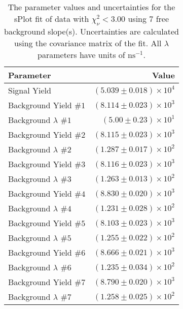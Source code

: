 
\begin{table}
    \begin{center}
        \begin{tabular}{lr}\toprule
            Parameter & Value \\\midrule
            Signal Yield & $(5.039 \pm 0.018) \times 10^{4}$ \\
            Background Yield $\#1$ & $(8.114 \pm 0.023) \times 10^{3}$ \\
            Background $\lambda$ $\#1$ & $(5.00 \pm 0.23) \times 10^{1}$ \\
            Background Yield $\#2$ & $(8.115 \pm 0.023) \times 10^{3}$ \\
            Background $\lambda$ $\#2$ & $(1.287 \pm 0.017) \times 10^{2}$ \\
            Background Yield $\#3$ & $(8.116 \pm 0.023) \times 10^{3}$ \\
            Background $\lambda$ $\#3$ & $(1.263 \pm 0.013) \times 10^{2}$ \\
            Background Yield $\#4$ & $(8.830 \pm 0.020) \times 10^{3}$ \\
            Background $\lambda$ $\#4$ & $(1.231 \pm 0.028) \times 10^{2}$ \\
            Background Yield $\#5$ & $(8.103 \pm 0.023) \times 10^{3}$ \\
            Background $\lambda$ $\#5$ & $(1.255 \pm 0.022) \times 10^{2}$ \\
            Background Yield $\#6$ & $(8.666 \pm 0.021) \times 10^{3}$ \\
            Background $\lambda$ $\#6$ & $(1.235 \pm 0.034) \times 10^{2}$ \\
            Background Yield $\#7$ & $(8.790 \pm 0.020) \times 10^{3}$ \\
            Background $\lambda$ $\#7$ & $(1.258 \pm 0.025) \times 10^{2}$ \\\bottomrule
        \end{tabular}
        \caption{The parameter values and uncertainties for the sPlot fit of data with $\chi^2_\nu < 3.00$ using 7 free background slope(s). Uncertainties are calculated using the covariance matrix of the fit. All $\lambda$ parameters have units of $\si{\nano\second}^{-1}$.}
    \end{center}
\end{table}
